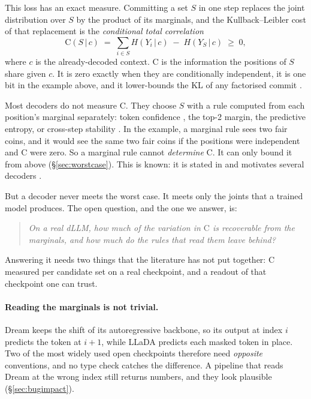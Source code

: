 \documentclass{article}
\newcommand{\C}{\mathrm{C}}
\newcommand{\given}{\,\vert\,}
\begin{document}
This loss has an exact measure. Committing a set $S$ in one step replaces the joint
distribution over $S$ by the product of its marginals, and the Kullback--Leibler cost of
that replacement is the \emph{conditional total correlation}
\begin{equation}
  \C(S \given c) \;=\; \sum_{i \in S} H(Y_i \given c) \;-\; H(Y_S \given c) \;\ge\; 0,
  \label{eq:tc}
\end{equation}
where $c$ is the already-decoded context. $\C$ is the information the positions of $S$
share given $c$. It is zero exactly when they are conditionally independent, it is one
bit in the example above, and it lower-bounds the KL of any factorised commit
\cite{parallelbench,huang}.

Most decoders do not measure $\C$. They choose $S$ with a rule computed from each
position's marginal separately: token confidence \cite{fastdllm,dynamicdllm}, the top-2
margin, the predictive entropy, or cross-step stability \cite{less,stability}. In the example, a marginal rule sees two fair coins, and it would
see the same two fair coins if the positions were independent and $\C$ were zero. So a
marginal rule cannot \emph{determine} $\C$. It can only bound it from above
(\S\ref{sec:worstcase}). This is known: it is stated in \cite{cocommit} and motivates
several decoders \cite{demask,dos}.

But a decoder never meets the worst case. It meets only the joints that a trained model
produces. The open question, and the one we answer, is:

\begin{quote}
\emph{On a real dLLM, how much of the variation in $\C$ is recoverable from the
marginals, and how much do the rules that read them leave behind?}
\end{quote}

Answering it needs two things that the literature has not put together: $\C$ measured
per candidate set on a real checkpoint, and a readout of that checkpoint one can trust.

\paragraph{Reading the marginals is not trivial.} Dream \cite{dream} keeps the shift of
its autoregressive backbone, so its output at index $i$ predicts the token at $i{+}1$,
while LLaDA \cite{llada} predicts each masked token in place. Two of the most widely
used open checkpoints therefore need \emph{opposite} conventions, and no type check
catches the difference. A pipeline that reads Dream at the wrong index still returns
numbers, and they look plausible (\S\ref{sec:bugimpact}).
\end{document}
